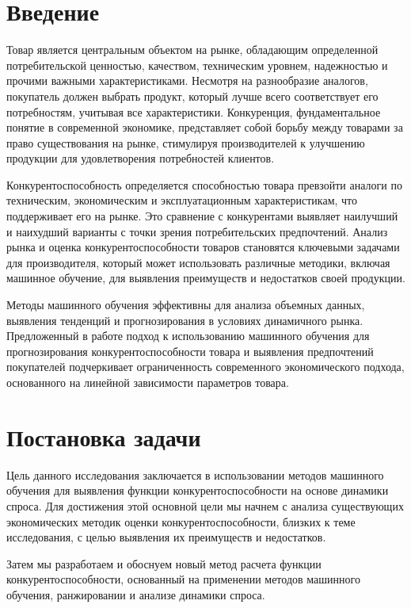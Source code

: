 \documentclass[14pt, a4paper]{extarticle}
\begin{document}
  \pagestyle{plain}
  \setcounter{page}{3}

  \section{Введение}
  Товар является центральным объектом на рынке, обладающим определенной
  потребительской ценностью, качеством, техническим уровнем, надежностью и
  прочими важными характеристиками. Несмотря на разнообразие аналогов,
  покупатель должен выбрать продукт, который лучше всего соответствует
  его потребностям, учитывая все характеристики. Конкуренция,
  фундаментальное понятие в современной экономике, представляет собой
  борьбу между товарами за право существования на рынке, стимулируя
  производителей к улучшению продукции для удовлетворения потребностей
  клиентов.
  
  Конкурентоспособность определяется способностью товара превзойти
  аналоги по техническим, экономическим и эксплуатационным
  характеристикам, что поддерживает его на рынке. Это сравнение с
  конкурентами выявляет наилучший и наихудший варианты с точки зрения
  потребительских предпочтений. Анализ рынка и оценка
  конкурентоспособности товаров становятся ключевыми задачами для
  производителя, который может использовать различные методики, включая
  машинное обучение, для выявления преимуществ и недостатков своей
  продукции.
  
  Методы машинного обучения эффективны для анализа объемных данных,
  выявления тенденций и прогнозирования в условиях динамичного рынка.
  Предложенный в работе подход к использованию машинного обучения для
  прогнозирования конкурентоспособности товара и выявления предпочтений
  покупателей подчеркивает ограниченность современного экономического
  подхода, основанного на линейной зависимости параметров товара.
  \newpage

  \section{Постановка задачи}
  Цель данного исследования заключается в использовании методов машинного
  обучения для выявления функции конкурентоспособности на основе динамики
  спроса. Для достижения этой основной цели мы начнем с анализа
  существующих экономических методик оценки конкурентоспособности,
  близких к теме исследования, с целью выявления их преимуществ и
  недостатков.
  
  Затем мы разработаем и обоснуем новый метод расчета функции
  конкурентоспособности, основанный на применении методов машинного
  обучения, ранжировании и анализе динамики спроса.
  
\end{document}
